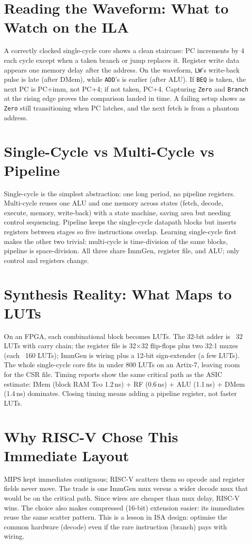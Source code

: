 \section{Reading the Waveform: What to Watch on the ILA}
A correctly clocked single-cycle core shows a clean staircase: PC increments by 4 each cycle except when a taken branch or jump replaces it. Register write data appears one memory delay after the address. On the waveform, \texttt{LW}'s write-back pulse is late (after DMem), while \texttt{ADD}'s is earlier (after ALU). If \texttt{BEQ} is taken, the next PC is PC+imm, not PC+4; if not taken, PC+4. Capturing \texttt{Zero} and \texttt{Branch} at the rising edge proves the comparison landed in time. A failing setup shows as \texttt{Zero} still transitioning when PC latches, and the next fetch is from a phantom address.

\section{Single-Cycle vs Multi-Cycle vs Pipeline}
Single-cycle is the simplest abstraction: one long period, no pipeline registers. Multi-cycle reuses one ALU and one memory across states (fetch, decode, execute, memory, write-back) with a state machine, saving area but needing control sequencing. Pipeline keeps the single-cycle datapath blocks but inserts registers between stages so five instructions overlap. Learning single-cycle first makes the other two trivial: multi-cycle is time-division of the same blocks, pipeline is space-division. All three share ImmGen, register file, and ALU; only control and registers change.


\section{Synthesis Reality: What Maps to LUTs}
On an FPGA, each combinational block becomes LUTs. The 32-bit adder is ~32 LUTs with carry chain; the register file is 32$\times$32 flip-flops plus two 32:1 muxes (each ~160 LUTs); ImmGen is wiring plus a 12-bit sign-extender (a few LUTs). The whole single-cycle core fits in under 800 LUTs on an Artix-7, leaving room for the CSR file. Timing reports show the same critical path as the ASIC estimate: IMem (block RAM Tco 1.2\,ns) + RF (0.6\,ns) + ALU (1.1\,ns) + DMem (1.4\,ns) dominates. Closing timing means adding a pipeline register, not faster LUTs.

\section{Why RISC-V Chose This Immediate Layout}
MIPS kept immediates contiguous; RISC-V scatters them so opcode and register fields never move. The trade is one ImmGen mux versus a wider decode mux that would be on the critical path. Since wires are cheaper than mux delay, RISC-V wins. The choice also makes compressed (16-bit) extension easier: its immediates reuse the same scatter pattern. This is a lesson in ISA design: optimise the common hardware (decode) even if the rare instruction (branch) pays with wiring.



